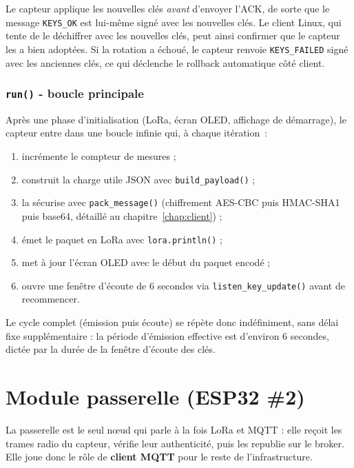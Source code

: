 \documentclass[a4paper,11pt]{report}
\begin{document}
\begin{explication}
Le capteur applique les nouvelles clés \emph{avant} d'envoyer l'ACK, de sorte que le message
\texttt{KEYS\_OK} est lui-même signé avec les nouvelles clés. Le client Linux, qui tente de le déchiffrer
avec les nouvelles clés, peut ainsi confirmer que le capteur les a bien adoptées. Si la rotation a
échoué, le capteur renvoie \texttt{KEYS\_FAILED} signé avec les anciennes clés, ce qui déclenche
le rollback automatique côté client.
\end{explication}

\subsection{\texttt{run()} - boucle principale}
Après une phase d'initialisation (LoRa, écran OLED, affichage de démarrage), le capteur entre dans une
boucle infinie qui, à chaque itération~:
\begin{enumerate}
    \item incrémente le compteur de mesures ;
    \item construit la charge utile JSON avec \texttt{build\_payload()} ;
    \item la sécurise avec \texttt{pack\_message()} (chiffrement AES-CBC puis HMAC-SHA1 puis base64,
    détaillé au chapitre~\ref{chap:client}) ;
    \item émet le paquet en LoRa avec \texttt{lora.println()} ;
    \item met à jour l'écran OLED avec le début du paquet encodé ;
    \item ouvre une fenêtre d'écoute de 6 secondes via \texttt{listen\_key\_update()} avant de recommencer.
\end{enumerate}
Le cycle complet (émission puis écoute) se répète donc indéfiniment, sans délai fixe supplémentaire : la
période d'émission effective est d'environ 6 secondes, dictée par la durée de la fenêtre d'écoute des clés.

\chapter{Module passerelle (ESP32 \#2)}
\label{chap:passerelle}

La passerelle est le seul nœud qui parle à la fois LoRa et MQTT : elle reçoit les trames radio du
capteur, vérifie leur authenticité, puis les republie sur le broker. Elle joue donc le rôle de
\textbf{client MQTT} pour le reste de l'infrastructure.
\end{document}
